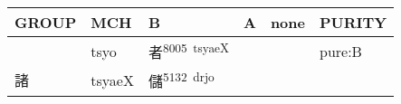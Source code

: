 \documentclass[14pt,a4paper]{scrartcl}
\begin{document}
\begin{longtable}[c]{@{}llllll@{}}
\toprule
\begin{minipage}[b]{0.14\columnwidth}\raggedright\strut
GROUP
\strut\end{minipage} &
\begin{minipage}[b]{0.14\columnwidth}\raggedright\strut
MCH
\strut\end{minipage} &
\begin{minipage}[b]{0.14\columnwidth}\raggedright\strut
B
\strut\end{minipage} &
\begin{minipage}[b]{0.14\columnwidth}\raggedright\strut
A
\strut\end{minipage} &
\begin{minipage}[b]{0.14\columnwidth}\raggedright\strut
none
\strut\end{minipage} &
\begin{minipage}[b]{0.14\columnwidth}\raggedright\strut
PURITY
\strut\end{minipage}\tabularnewline
\midrule
\endhead
\begin{minipage}[t]{0.14\columnwidth}\raggedright\strut
𣥏
\strut\end{minipage} &
\begin{minipage}[t]{0.14\columnwidth}\raggedright\strut
tsyo
\strut\end{minipage} &
\begin{minipage}[t]{0.14\columnwidth}\raggedright\strut
者\textsuperscript{8005~tsyaeX}
\strut\end{minipage} &
\begin{minipage}[t]{0.14\columnwidth}\raggedright\strut
\strut\end{minipage} &
\begin{minipage}[t]{0.14\columnwidth}\raggedright\strut
\strut\end{minipage} &
\begin{minipage}[t]{0.14\columnwidth}\raggedright\strut
pure:B
\strut\end{minipage}\tabularnewline
\begin{minipage}[t]{0.14\columnwidth}\raggedright\strut
諸
\strut\end{minipage} &
\begin{minipage}[t]{0.14\columnwidth}\raggedright\strut
tsyaeX
\strut\end{minipage} &
\begin{minipage}[t]{0.14\columnwidth}\raggedright\strut
儲\textsuperscript{5132~drjo}
\strut\end{minipage} &

\end{longtable}
\end{document}
